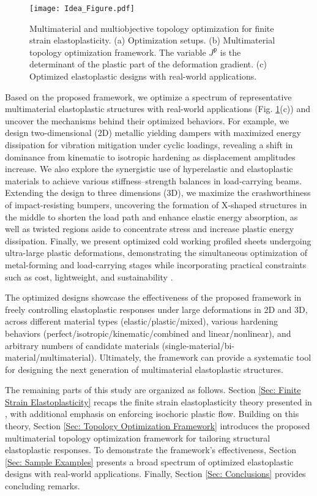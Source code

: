 \documentclass[preprint,11pt]{elsarticle}
\theoremstyle{definition}
\begin{document}
\begin{figure}[!htbp]
    \centering
    \texttt{[image: Idea\_Figure.pdf]}
    \caption{Multimaterial and multiobjective topology optimization for finite strain elastoplasticity. (a) Optimization setups. (b) Multimaterial topology optimization framework. The variable $J^\texttt{p}$ is the determinant of the plastic part of the deformation gradient. (c) Optimized elastoplastic designs with real-world applications.}
    \label{Fig: Idea Figure}
\end{figure}

Based on the proposed framework, we optimize a spectrum of representative multimaterial elastoplastic structures with real-world applications (Fig. \ref{Fig: Idea Figure}(c)) and uncover the mechanisms behind their optimized behaviors. For example, we design two-dimensional (2D) metallic yielding dampers with maximized energy dissipation for vibration mitigation under cyclic loadings, revealing a shift in dominance from kinematic to isotropic hardening as displacement amplitudes increase. We also explore the synergistic use of hyperelastic and elastoplastic materials to achieve various stiffness--strength balances in load-carrying beams. Extending the design to three dimensions (3D), we maximize the crashworthiness of impact-resisting bumpers, uncovering the formation of X-shaped structures in the middle to shorten the load path and enhance elastic energy absorption, as well as twisted regions aside to concentrate stress and increase plastic energy dissipation. Finally, we present optimized cold working profiled sheets undergoing ultra-large plastic deformations, demonstrating the simultaneous optimization of metal-forming and load-carrying stages while incorporating practical constraints such as cost, lightweight, and sustainability \citep{kundu2025sustainability}.

The optimized designs showcase the effectiveness of the proposed framework in freely controlling elastoplastic responses under large deformations in 2D and 3D, across different material types (elastic/plastic/mixed), various hardening behaviors (perfect/isotropic/kinematic/combined and linear/nonlinear), and arbitrary numbers of candidate materials (single-material/bi-material/multimaterial). Ultimately, the framework can provide a systematic tool for designing the next generation of multimaterial elastoplastic structures.

The remaining parts of this study are organized as follows. Section \ref{Sec: Finite Strain Elastoplasticity} recaps the finite strain elastoplasticity theory presented in \citet{simo_framework_1988-1, simo_framework_1988}, with additional emphasis on enforcing isochoric plastic flow. Building on this theory, Section \ref{Sec: Topology Optimization Framework} introduces the proposed multimaterial topology optimization framework for tailoring structural elastoplastic responses. To demonstrate the framework’s effectiveness, Section \ref{Sec: Sample Examples} presents a broad spectrum of optimized elastoplastic designs with real-world applications. Finally, Section \ref{Sec: Conclusions} provides concluding remarks.
\end{document}
